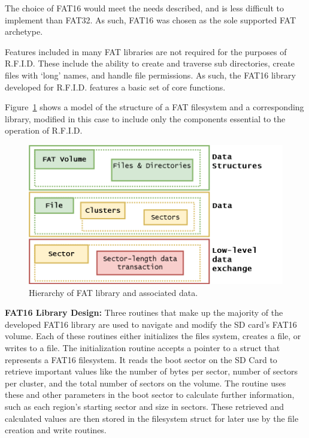 

The choice of FAT16 would meet the needs described, and is less difficult to implement than FAT32. As such, FAT16 was chosen as the sole supported FAT archetype. 

Features included in many FAT libraries are not required for the purposes of R.F.I.D. These include the ability to create and traverse sub directories, create files with `long' names, and handle file permissions. As such, the FAT16 library developed for R.F.I.D. features a basic set of core functions.

Figure~\ref{fig:FAT_layers} shows a model of the structure of a FAT filesystem and a corresponding library, modified in this case to include only the components essential to the operation of R.F.I.D.

\begin{figure}[H]
    \centering
    \includegraphics[width=1\textwidth]{Figures/4_details/FAT_layers.png} 
    \caption{Hierarchy of FAT library and associated data.}
    \label{fig:FAT_layers}
\end{figure}

\label{ssss:FAT_design}
\textbf{FAT16 Library Design:}
Three routines that make up the majority of the developed FAT16 library are used to navigate and modify the SD card's FAT16 volume. Each of these routines either initializes the files system, creates a file, or writes to a file. The initialization routine accepts a pointer to a struct that represents a FAT16 filesystem. It reads the boot sector on the SD Card to retrieve important values like the number of bytes per sector, number of sectors per cluster, and the total number of sectors on the volume. The routine uses these and other parameters in the boot sector to calculate further information, such as each region's starting sector and size in sectors. These retrieved and calculated values are then stored in the filesystem struct for later use by the file creation and write routines.

